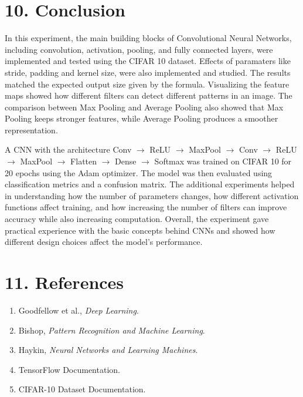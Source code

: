 \documentclass[11pt]{article}
\begin{document}
\vspace{6mm}
\section*{10. Conclusion}

In this experiment, the main building blocks of Convolutional Neural Networks, including convolution, activation, pooling, and fully connected layers, were implemented and tested using the CIFAR 10 dataset. Effects of paramaters like stride, padding and kernel size, were also implemented and studied. The results matched the expected output size given by the formula. Visualizing the feature maps showed how different filters can detect different patterns in an image. The comparison between Max Pooling and Average Pooling also showed that Max Pooling keeps stronger features, while Average Pooling produces a smoother representation.

A CNN with the architecture Conv $\rightarrow$ ReLU $\rightarrow$ MaxPool $\rightarrow$ Conv $\rightarrow$ ReLU $\rightarrow$ MaxPool $\rightarrow$ Flatten $\rightarrow$ Dense $\rightarrow$ Softmax was trained on CIFAR 10 for 20 epochs using the Adam optimizer. The model was then evaluated using classification metrics and a confusion matrix. The additional experiments helped in understanding how the number of parameters changes, how different activation functions affect training, and how increasing the number of filters can improve accuracy while also increasing computation. Overall, the experiment gave practical experience with the basic concepts behind CNNs and showed how different design choices affect the model's performance.

\vspace{6mm}
\section*{11. References}
\begin{enumerate}
\item Goodfellow et al., \emph{Deep Learning}.
\item Bishop, \emph{Pattern Recognition and Machine Learning}.
\item Haykin, \emph{Neural Networks and Learning Machines}.
\item TensorFlow Documentation.
\item CIFAR-10 Dataset Documentation.
\end{enumerate}
\end{document}
